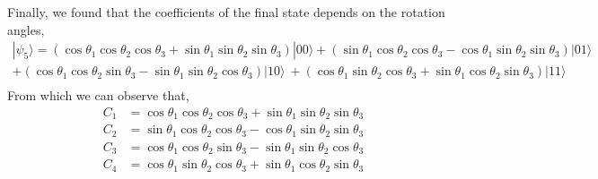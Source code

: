 \documentclass[11p]{article}
\begin{document}
Finally, we found that the coefficients of the final state depends on the rotation angles,
\begin{multline*}
|\psi_5\rangle=(\cos\theta_1\cos\theta_2\cos\theta_3+\sin\theta_1\sin\theta_2\sin\theta_3)|00\rangle +(\sin\theta_1\cos\theta_2\cos\theta_3-\cos\theta_1\sin\theta_2\sin\theta_3)|01\rangle\\ +(\cos\theta_1\cos\theta_2\sin\theta_3-\sin\theta_1\sin\theta_2\cos\theta_3)|10\rangle\ +(\cos\theta_1\sin\theta_2\cos\theta_3+\sin\theta_1\cos\theta_2\sin\theta_3)|11\rangle\\
\end{multline*}
From which we can observe that,
\begin{align}
C_1 &= \cos\theta_1\cos\theta_2\cos\theta_3+\sin\theta_1\sin\theta_2\sin\theta_3\\
C_2 &= \sin\theta_1\cos\theta_2\cos\theta_3-\cos\theta_1\sin\theta_2\sin\theta_3\\
C_3 &= \cos\theta_1\cos\theta_2\sin\theta_3-\sin\theta_1\sin\theta_2\cos\theta_3\\
C_4 &= \cos\theta_1\sin\theta_2\cos\theta_3+\sin\theta_1\cos\theta_2\sin\theta_3
\end{align}
\end{document}
